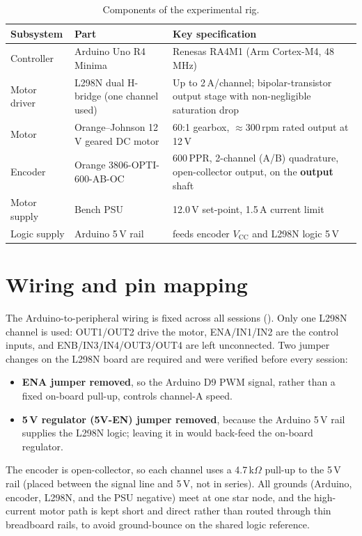\begin{table}[t]
  \centering
  \caption{Components of the experimental rig.}
  \label{tab:components}
  \footnotesize
  \begin{tabular}{@{}p{2.4cm}p{3.6cm}p{6.4cm}@{}}
    \toprule
    Subsystem & Part & Key specification \\
    \midrule
    Controller & Arduino Uno R4 Minima & Renesas RA4M1 (Arm Cortex-M4, 48\,MHz) \\
    Motor driver & L298N dual H-bridge (one channel used) & Up to 2\,A/channel; bipolar-transistor output stage with non-negligible saturation drop \\
    Motor & Orange--Johnson 12\,V geared DC motor & 60:1 gearbox, ${\approx}300$\,rpm rated output at 12\,V \\
    Encoder & Orange 3806-OPTI-600-AB-OC & 600\,PPR, 2-channel (A/B) quadrature, open-collector output, on the \textbf{output} shaft \\
    Motor supply & Bench PSU & 12.0\,V set-point, 1.5\,A current limit \\
    Logic supply & Arduino 5\,V rail & feeds encoder $V_{\mathrm{CC}}$ and L298N logic 5\,V \\
    \bottomrule
  \end{tabular}
\end{table}

\section{Wiring and pin mapping}
\label{sec:wiring}

The Arduino-to-peripheral wiring is fixed across all sessions (). Only one L298N channel is used: OUT1/OUT2 drive the motor, ENA/IN1/IN2 are the control inputs, and ENB/IN3/IN4/OUT3/OUT4 are left unconnected. Two jumper changes on the L298N board are required and were verified before every session:
\begin{itemize}
  \item \textbf{ENA jumper removed}, so the Arduino D9 PWM signal, rather than a fixed on-board pull-up, controls channel-A speed.
  \item \textbf{5\,V regulator (5V-EN) jumper removed}, because the Arduino 5\,V rail supplies the L298N logic; leaving it in would back-feed the on-board regulator.
\end{itemize}

The encoder is open-collector, so each channel uses a 4.7\,k$\Omega$ pull-up to the 5\,V rail (placed between the signal line and 5\,V, not in series). All grounds (Arduino, encoder, L298N, and the PSU negative) meet at one star node, and the high-current motor path is kept short and direct rather than routed through thin breadboard rails, to avoid ground-bounce on the shared logic reference.

